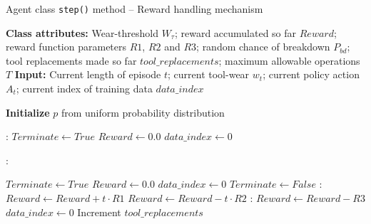 \documentclass[referee, sn-mathphys-num]{sn-jnl}
\begin{document}
	\begin{algorithm}[hbt!]
		\caption{Agent class \texttt{step()} method -- Reward handling mechanism}\label{alg:SSStep}
		\begin{algorithmic}[1]
			\newline
			\textbf{Class attributes:} Wear-threshold $W_\tau$; reward accumulated so far $Reward$; reward function parameters $R1$, $R2$ and $R3$; random chance of breakdown $P_{bd}$; tool replacements made so far $tool\_replacements$; maximum allowable operations $T$\newline
			\textbf{Input:} Current length of episode $t$; current tool-wear $w_t$; current policy action $A_t$;  current index of training data $data\_index$ \newline
			
			\State \textbf{Initialize} $p$ from uniform probability distribution
			
			:
			\State $Terminate \gets True$
			\State $Reward \gets 0.0$
			\State $data\_index \gets 0$	\newline
			
			
			:
			
			\State $Terminate \gets True$
			\State $Reward \gets 0.0$
			\State $data\_index \gets 0$		
			\Else
			\State $Terminate \gets False$
			:
			\State $Reward \gets Reward + t \cdot R1$
			\Else
			\State $Reward \gets Reward - t \cdot R2$	
			\EndIf
			:
			\State $Reward \gets Reward - R3$
			\State $data\_index \gets 0$ 
			\State Increment $tool\_replacements$
			\EndIf			
			\EndIf
			\EndProcedure
		\end{algorithmic}
	\end{algorithm}
	
\end{document}
